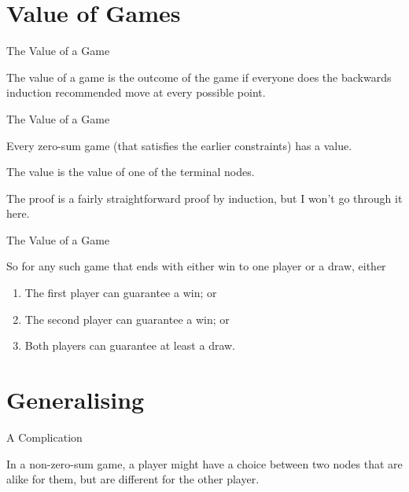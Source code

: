 \documentclass[ignorenonframetext,]{beamer}
\providecommand{\tightlist}{%
  \setlength{\itemsep}{0pt}\setlength{\parskip}{0pt}}
\renewcommand{\,}{\text{, }}
\begin{document}
\hypertarget{value-of-games}{%
\section{Value of Games}\label{value-of-games}}

\begin{frame}{The Value of a Game}
\protect\hypertarget{the-value-of-a-game}{}

The value of a game is the outcome of the game if everyone does the
backwards induction recommended move at every possible point.

\end{frame}

\begin{frame}{The Value of a Game}
\protect\hypertarget{the-value-of-a-game-1}{}

Every zero-sum game (that satisfies the earlier constraints) has a
value.

\pause \bigskip

The value is the value of one of the terminal nodes.

\pause \bigskip

The proof is a fairly straightforward proof by induction, but I won't go
through it here.

\end{frame}

\begin{frame}{The Value of a Game}
\protect\hypertarget{the-value-of-a-game-2}{}

So for any such game that ends with either win to one player or a draw,
either

\begin{enumerate}
\tightlist
\item
  The first player can guarantee a win; or
\item
  The second player can guarantee a win; or
\item
  Both players can guarantee at least a draw.
\end{enumerate}

\end{frame}

\hypertarget{generalising}{%
\section{Generalising}\label{generalising}}

\begin{frame}{A Complication}
\protect\hypertarget{a-complication}{}

In a non-zero-sum game, a player might have a choice between two nodes
that are alike for them, but are different for the other player.

\end{frame}
\end{document}
